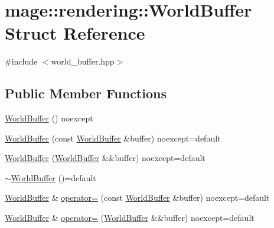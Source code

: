 \hypertarget{structmage_1_1rendering_1_1_world_buffer}{}\section{mage\+:\+:rendering\+:\+:World\+Buffer Struct Reference}
\label{structmage_1_1rendering_1_1_world_buffer}


{\ttfamily \#include $<$world\+\_\+buffer.\+hpp$>$}

\subsection*{Public Member Functions}
\begin{DoxyCompactItemize}
\item 
\mbox{\hyperlink{structmage_1_1rendering_1_1_world_buffer_a7f51349a6ffa759e245230fa26eaf318}{World\+Buffer}} () noexcept
\item 
\mbox{\hyperlink{structmage_1_1rendering_1_1_world_buffer_a70a1f1b062c0548f2ff87db8d78749f2}{World\+Buffer}} (const \mbox{\hyperlink{structmage_1_1rendering_1_1_world_buffer}{World\+Buffer}} \&buffer) noexcept=default
\item 
\mbox{\hyperlink{structmage_1_1rendering_1_1_world_buffer_ab5cce49c9fe1bbe5e7db5f98df3dbf1a}{World\+Buffer}} (\mbox{\hyperlink{structmage_1_1rendering_1_1_world_buffer}{World\+Buffer}} \&\&buffer) noexcept=default
\item 
\mbox{\hyperlink{structmage_1_1rendering_1_1_world_buffer_afdfdecc619400706fa89e24f3ce14a43}{$\sim$\+World\+Buffer}} ()=default
\item 
\mbox{\hyperlink{structmage_1_1rendering_1_1_world_buffer}{World\+Buffer}} \& \mbox{\hyperlink{structmage_1_1rendering_1_1_world_buffer_a0a776f3c84577f8530cf5932274cd8c9}{operator=}} (const \mbox{\hyperlink{structmage_1_1rendering_1_1_world_buffer}{World\+Buffer}} \&buffer) noexcept=default
\item 
\mbox{\hyperlink{structmage_1_1rendering_1_1_world_buffer}{World\+Buffer}} \& \mbox{\hyperlink{structmage_1_1rendering_1_1_world_buffer_a3fcc219d1410d858cc3b15f1cac5da9a}{operator=}} (\mbox{\hyperlink{structmage_1_1rendering_1_1_world_buffer}{World\+Buffer}} \&\&buffer) noexcept=default
\end{DoxyCompactItemize}
